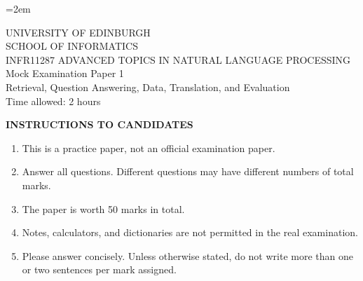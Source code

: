 \documentclass[11pt,a4paper]{article}
\begin{document}
\emergencystretch=2em

\begin{center}
{\Large UNIVERSITY OF EDINBURGH}\\[0.3em]
{\large SCHOOL OF INFORMATICS}\\[2em]
{\Large INFR11287 ADVANCED TOPICS IN NATURAL LANGUAGE PROCESSING}\\[1em]
{\Large Mock Examination Paper 1}\\[0.8em]
{\large Retrieval, Question Answering, Data, Translation, and Evaluation}\\[2em]
{\large Time allowed: 2 hours}\\[1em]
\end{center}

\noindent\textbf{INSTRUCTIONS TO CANDIDATES}
\begin{enumerate}
\item This is a practice paper, not an official examination paper.
\item Answer all questions. Different questions may have different numbers of total marks.
\item The paper is worth 50 marks in total.
\item Notes, calculators, and dictionaries are not permitted in the real examination.
\item Please answer concisely. Unless otherwise stated, do not write more than one or two sentences per mark assigned.
\end{enumerate}

\newpage
\end{document}
